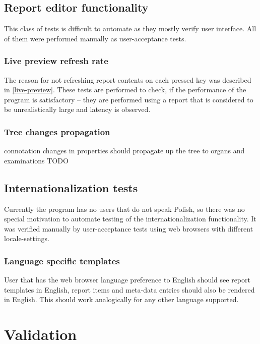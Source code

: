 \documentclass[12pt, twoside, openany]{report}
\theoremstyle{definition}
\begin{document}
\section{Report editor functionality}
	This class of tests is difficult to automate as they mostly verify user interface. All of them were performed manually as user-acceptance tests.
	\subsection{Live preview refresh rate}
	The reason for not refreshing report contents on each pressed key was described in \ref{live-preview}. These tests are performed to check, if the performance of the program is satisfactory – they are performed using a report that is considered to be unrealistically large and latency is observed. 
	\subsection{Tree changes propagation}
	connotation changes in properties should propagate up the tree to organs and examinations TODO
	


\section{Internationalization tests}
Currently the program has no users that do not speak Polish, so there was no special motivation to automate testing of the internationalization functionality. It was verified manually by user-acceptance tests using web browsers with different locale-settings.
\subsection{Language specific templates}
User that has the web browser language preference to English should see report templates in English, report items and meta-data entries should also be rendered in English. This should work analogically for any other language supported.




\chapter{Validation}
\end{document}
